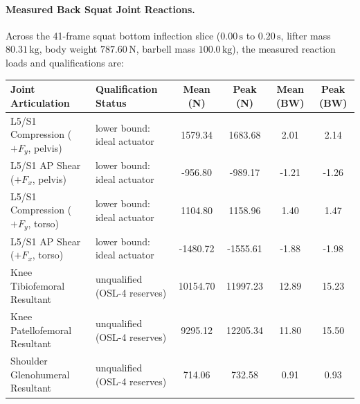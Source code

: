 \documentclass[11pt,a4paper]{article}
\begin{document}
\paragraph{Measured Back Squat Joint Reactions.}
Across the 41-frame squat bottom inflection slice ($0.00\,\mathrm{s}$ to $0.20\,\mathrm{s}$, lifter mass $80.31\,\mathrm{kg}$, body weight $787.60\,\mathrm{N}$, barbell mass $100.0\,\mathrm{kg}$),
the measured reaction loads and qualifications are:
\begin{center}\footnotesize\setlength{\tabcolsep}{3pt}
\begin{tabular}{llcccc}
\toprule
Joint Articulation & Qualification Status & Mean (N) & Peak (N) & Mean (BW) & Peak (BW)\\
\midrule
L5/S1 Compression ($+F_y$, pelvis) & lower bound: ideal actuator & 1579.34 & 1683.68 & 2.01 & 2.14\\
L5/S1 AP Shear ($+F_x$, pelvis) & lower bound: ideal actuator & -956.80 & -989.17 & -1.21 & -1.26\\
L5/S1 Compression ($+F_y$, torso) & lower bound: ideal actuator & 1104.80 & 1158.96 & 1.40 & 1.47\\
L5/S1 AP Shear ($+F_x$, torso) & lower bound: ideal actuator & -1480.72 & -1555.61 & -1.88 & -1.98\\
Knee Tibiofemoral Resultant & unqualified (OSL-4 reserves) & 10154.70 & 11997.23 & 12.89 & 15.23\\
Knee Patellofemoral Resultant & unqualified (OSL-4 reserves) & 9295.12 & 12205.34 & 11.80 & 15.50\\
Shoulder Glenohumeral Resultant & unqualified (OSL-4 reserves) & 714.06 & 732.58 & 0.91 & 0.93\\
\bottomrule
\end{tabular}
\end{center}
\end{document}

